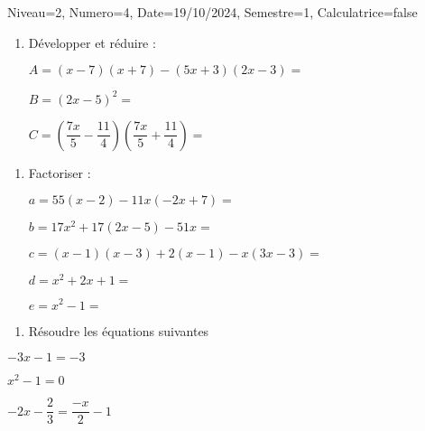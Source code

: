 \documentclass[a4paper,12pt]{article}
\begin{document}
\begin{Maquette}[DS]{Niveau=2, Numero=4, Date=19/10/2024, Semestre=1, Calculatrice=false}

\begin{exercice}
\begin{enumerate}
\item{} Développer et réduire :

\(
A=\left(x-7\right)\left(x+7\right)-\left(5x+3\right)\left(2x-3\right)=\)\anserline[2]

\(
B=\left(2x-5\right)^{2}=\)\anserline[1]

\(
C=\left(\dfrac{7x}{5}-\dfrac{11}{4}\right)\left(\dfrac{7x}{5}+\dfrac{11}{4}\right)=\)\anserline[1]

\end{enumerate}
\end{exercice}

\begin{exercice}
\begin{enumerate}
\item{} Factoriser :

\(
a=55\left(x-2\right)-11x\left(-2x+7\right)=\)\anserline[1]

\(
b=17x^{2}+17\left(2x-5\right)-51x=\)\anserline[1]

\(
c=\left(x-1\right)\left(x-3\right)+2\left(x-1\right)-x\left(3x-3\right)=\)\anserline[1]

\(
d=x^{2}+2x+1=\)\anserline[1]

\(
e=x^{2}-1=\)\anserline[1]

\end{enumerate}
\end{exercice}

\begin{exercice}
\begin{enumerate}
\item{} Résoudre les équations suivantes 
\end{enumerate}
\begin{multicols}{3}
\(-3x-1=-3\)\newline
\anserline[4]
\columnbreak

\(x^{2}-1=0\)\newline
\anserline[4]
\columnbreak

\(-2x-\dfrac{2}{3}=\dfrac{-x}{2}-1\)\newline
\anserline[4]
\end{multicols}
\end{exercice}
\end{Maquette}
\end{document}
